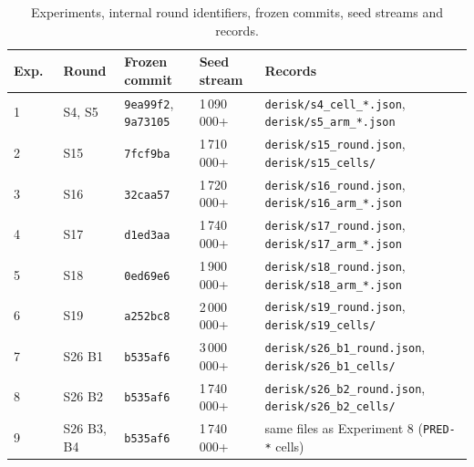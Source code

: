 \documentclass{l4dc2027}
\begin{document}
\begin{table}[h]
\centering\footnotesize
\caption{Experiments, internal round identifiers, frozen commits, seed streams and records.}
\label{tab:experiments}
\begin{tabular}{@{}llllp{5.2cm}@{}}
\toprule
Exp.\ & Round & Frozen commit & Seed stream & Records \\
\midrule
1 & S4, S5 & \texttt{9ea99f2}, \texttt{9a73105} & 1\,090\,000+ & \texttt{derisk/s4\_cell\_*.json}, \texttt{derisk/s5\_arm\_*.json} \\
2 & S15 & \texttt{7fcf9ba} & 1\,710\,000+ & \texttt{derisk/s15\_round.json}, \texttt{derisk/s15\_cells/} \\
3 & S16 & \texttt{32caa57} & 1\,720\,000+ & \texttt{derisk/s16\_round.json}, \texttt{derisk/s16\_arm\_*.json} \\
4 & S17 & \texttt{d1ed3aa} & 1\,740\,000+ & \texttt{derisk/s17\_round.json}, \texttt{derisk/s17\_arm\_*.json} \\
5 & S18 & \texttt{0ed69e6} & 1\,900\,000+ & \texttt{derisk/s18\_round.json}, \texttt{derisk/s18\_arm\_*.json} \\
6 & S19 & \texttt{a252bc8} & 2\,000\,000+ & \texttt{derisk/s19\_round.json}, \texttt{derisk/s19\_cells/} \\
7 & S26 B1 & \texttt{b535af6} & 3\,000\,000+ & \texttt{derisk/s26\_b1\_round.json}, \texttt{derisk/s26\_b1\_cells/} \\
8 & S26 B2 & \texttt{b535af6} & 1\,740\,000+ & \texttt{derisk/s26\_b2\_round.json}, \texttt{derisk/s26\_b2\_cells/} \\
9 & S26 B3, B4 & \texttt{b535af6} & 1\,740\,000+ & same files as Experiment 8 (\texttt{PRED-*} cells) \\
\bottomrule
\end{tabular}
\end{table}
\end{document}
